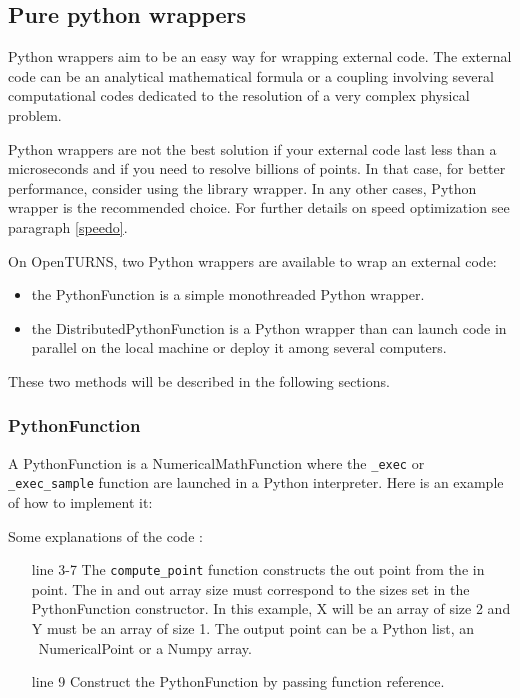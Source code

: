 

\subsection{Pure python wrappers}

Python wrappers aim to be an easy way for wrapping external code. The external code can be an analytical mathematical formula or a coupling involving several computational codes dedicated to the resolution of a very complex physical problem.

Python wrappers are not the best solution if your external code last less than a microseconds and if you need to resolve billions of points. In that case, for better performance, consider using the library wrapper. In any other cases, Python wrapper is the recommended choice. For further details on speed optimization see paragraph \ref{speedo}.

On OpenTURNS, two Python wrappers are available to wrap an external code:
\begin{itemize}
\item the PythonFunction is a simple monothreaded Python wrapper.
\item the DistributedPythonFunction is a Python wrapper than can launch code in parallel on the local machine or deploy it among several computers.
\end{itemize}
These two methods will be described in the following sections.


\subsubsection{PythonFunction}

A PythonFunction is a NumericalMathFunction where the \verb|_exec| or \verb|_exec_sample| function are launched in a Python interpreter.
Here is an example of how to implement it:


Some explanations of the code :
\begin{itemize}
\item[line 3-7] The \verb|compute_point| function constructs the out point from the in point. The in and out array size must correspond to the sizes set in the PythonFunction constructor. In this example, X will be an array of size 2 and Y must be an array of size 1. The output point can be a Python list, an \OT\ NumericalPoint or a Numpy array.
\item[line 9] Construct the PythonFunction by passing function reference.
\end{itemize}


